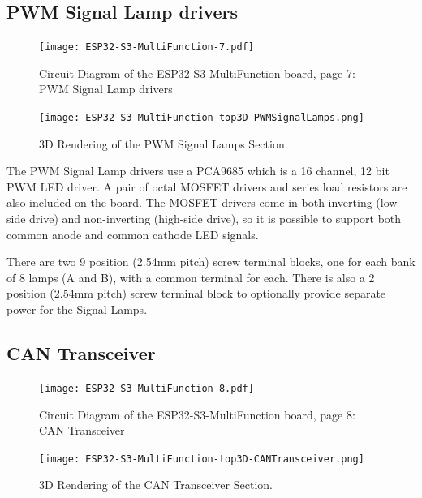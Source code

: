 \subsection{PWM Signal Lamp drivers}
\begin{figure}[hbpt]\begin{centering}%
\texttt{[image: ESP32-S3-MultiFunction-7.pdf]}
\caption{Circuit Diagram of the ESP32-S3-MultiFunction board, page 7: PWM 
Signal Lamp drivers}
\end{centering}\end{figure}
\begin{figure}[hbpt]\begin{centering}%
\texttt{[image: ESP32-S3-MultiFunction-top3D-PWMSignalLamps.png]}
\caption{3D Rendering of the PWM Signal Lamps Section.}
\end{centering}\end{figure}

The PWM Signal Lamp drivers use a PCA9685 which is a 16 channel, 12 bit PWM
LED driver. A pair of octal MOSFET drivers and series load resistors are also
included on the board. The MOSFET drivers come in both inverting (low-side
drive) and non-inverting (high-side drive), so it is possible to support both
common anode and common cathode LED signals. 

There are two 9 position (2.54mm pitch) screw terminal blocks, one for each
bank of 8 lamps (A and B), with a common terminal for each. There is also a 2
position (2.54mm pitch) screw terminal block to optionally provide separate
power for the Signal Lamps.

\subsection{CAN Transceiver}
\begin{figure}[hbpt]\begin{centering}%
\texttt{[image: ESP32-S3-MultiFunction-8.pdf]}
\caption{Circuit Diagram of the ESP32-S3-MultiFunction board, page 8: CAN 
Transceiver}
\end{centering}\end{figure}
\begin{figure}[hbpt]\begin{centering}%
\texttt{[image: ESP32-S3-MultiFunction-top3D-CANTransceiver.png]}
\caption{3D Rendering of the CAN Transceiver  Section.}
\end{centering}\end{figure}

